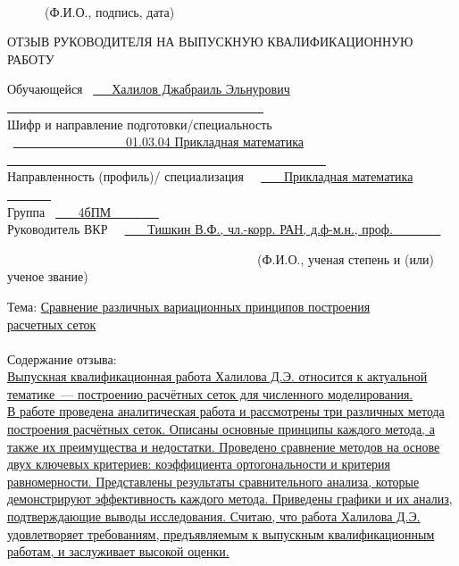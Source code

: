 \documentclass[a4paper,14pt,russian]{extreport}
\renewcommand{\_}{\kern-1.5pt\textunderscore\kern-1.5pt}
\begin{document}
\begin{flushleft}
\begin{small}
			{\fontsize{10pt}{12.0pt}\selectfont \ \ \ \ \ \ \ \ \ \ \ \ \ \ \ \ \ \ \ \ \ \ \ \ \ \ \ \ \ \ \ \ \ \ \ \ \ \ \ \ \ \ \ \ \ \ \ \ \ \ \ \ \ \ \ \ \ \ \ \ \ \ \ \ \ \ \ \ \ \ \ \ \ \ \ \ \ \  (Ф.И.О., подпись, дата)\par}
			
		\end{small}
		
	\end{flushleft}
	\newpage
	
	\thispagestyle{empty}
	\begin{center}
		ОТЗЫВ РУКОВОДИТЕЛЯ НА ВЫПУСКНУЮ КВАЛИФИКАЦИОННУЮ РАБОТУ
	\end{center}
	Обучающейся
	\ \uline{\ \ \ Халилов Джабраиль Эльнурович \ \ \ \ \ \ \ \ \ \ \ \ \ \ \ \ \ \ \ \ \ \ \ \ \ \ \ \ \ \ \ \ \ \ \ \ \ \ \ \ \  }\\
	Шифр и направление подготовки/специальность\\
	\ \uline{\ \ \ \ \ \ \ \ \ \ \ \ \ \ \ \ \ \ 01.03.04 Прикладная математика \ \ \ \ \ \ \ \ \ \ \ \ \ \ \ \ \ \ \ \ \ \ \ \ \ \ \ \ \ \ \ \ \ \ \ \ \ \ \ \ \ \ \ \ \ \ \ \ \ \ \  }\\
	Направленность (профиль)/ специализация \ \textcolor{white}{п}\uline{ \ \ \ Прикладная математика \ \ \ \ \ \ \ }\\
	Группа \ \uline{ \ \ \ 4бПМ \ \ \ \ \ \ \ }\\
	Руководитель ВКР \ \textcolor{white}{п}\uline{ \ \ \ Тишкин В.Ф., чл.-корр. РАН, д.ф-м.н., проф. \ \ \ \ \ \ \ }\\
	{\fontsize{10pt}{12.0pt}\selectfont \ \ \ \ \ \ \ \ \ \ \ \ \ \ \ \ \ \ \ \ \ \ \ \ \ \ \ \ \ \ \ \ \ \ \ \ \ \ \ \  (Ф.И.О., ученая степень и (или) ученое звание)\par}
	Тема: \uline{Сравнение различных вариационных принципов построения}\\
    \uline{расчетных сеток} \ \ \ \ \ \ \ \ \ \ \ \ \ \ \ \ \ \ \ \ \ \ \ \ \ \ \ \ \ \ \ \ \ \ \ \ \ \ \ \ \ \ \ \ \ \ \ \ \ \ \ \ \ \ \ \ \ \ \ \ \ \ \ \ \ \ \ \  
	\\
	Содержание отзыва: \\
 \uline{Выпускная квалификационная работа Халилова Д.Э. относится к актуальной тематике~--- построению расчётных сеток для численного моделирования.\\ 
    В работе проведена аналитическая работа и рассмотрены три различных метода построения расчётных сеток.
    Описаны основные принципы каждого метода, а также их преимущества и недостатки. 
    Проведено сравнение методов на основе двух ключевых критериев: коэффициента ортогональности и критерия равномерности. Представлены результаты сравнительного анализа, которые демонстрируют эффективность каждого метода.
    Приведены графики и их анализ, подтверждающие выводы исследования.
    Считаю, что работа Халилова Д.Э. удовлетворяет требованиям,
    предъявляемым к выпускным квалификационным работам, и заслуживает высокой оценки.}
\end{document}
